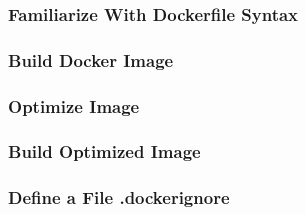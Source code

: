 \subsubsection*{Familiarize With Dockerfile Syntax}


\subsubsection*{Build Docker Image}


\subsubsection*{Optimize Image}


\subsubsection*{Build Optimized Image}


\subsubsection*{Define a File .dockerignore}
